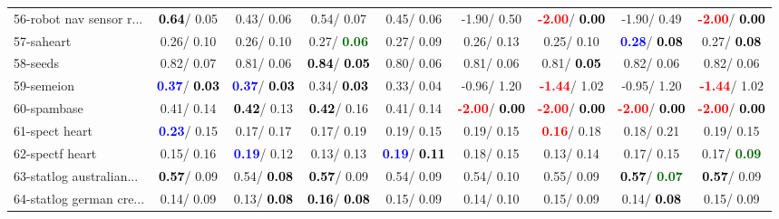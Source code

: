 \begin{table}[h]
\begin{center}
\begin{tabular}{lc|c|c|c|c|c|c|c}
56-robot nav sensor r... & \textcolor{black}{\textbf{  0.64}}/  0.05 &   0.43/  0.06 &   0.54/  0.07 &   0.45/  0.06 &  -1.90/  0.50 & \textcolor{red}{\textbf{ -2.00}}/\textcolor{black}{\textbf{  0.00}} &  -1.90/  0.49 & \textcolor{red}{\textbf{ -2.00}}/\textcolor{black}{\textbf{  0.00}} \\
57-saheart &   0.26/  0.10 &   0.26/  0.10 &   0.27/\textcolor{darkgreen}{\textbf{  0.06}} &   0.27/  0.09 &   0.26/  0.13 &   0.25/  0.10 & \textcolor{blue}{\textbf{  0.28}}/\textcolor{black}{\textbf{  0.08}} &   0.27/\textcolor{black}{\textbf{  0.08}} \\
58-seeds &   0.82/  0.07 &   0.81/  0.06 & \textcolor{black}{\textbf{  0.84}}/\textcolor{black}{\textbf{  0.05}} &   0.80/  0.06 &   0.81/  0.06 &   0.81/\textcolor{black}{\textbf{  0.05}} &   0.82/  0.06 &   0.82/  0.06 \\
59-semeion & \textcolor{blue}{\textbf{  0.37}}/\textcolor{black}{\textbf{  0.03}} & \textcolor{blue}{\textbf{  0.37}}/\textcolor{black}{\textbf{  0.03}} &   0.34/\textcolor{black}{\textbf{  0.03}} &   0.33/  0.04 &  -0.96/  1.20 & \textcolor{red}{\textbf{ -1.44}}/  1.02 &  -0.95/  1.20 & \textcolor{red}{\textbf{ -1.44}}/  1.02 \\
60-spambase &   0.41/  0.14 & \textcolor{black}{\textbf{  0.42}}/  0.13 & \textcolor{black}{\textbf{  0.42}}/  0.16 &   0.41/  0.14 & \textcolor{red}{\textbf{ -2.00}}/\textcolor{black}{\textbf{  0.00}} & \textcolor{red}{\textbf{ -2.00}}/\textcolor{black}{\textbf{  0.00}} & \textcolor{red}{\textbf{ -2.00}}/\textcolor{black}{\textbf{  0.00}} & \textcolor{red}{\textbf{ -2.00}}/\textcolor{black}{\textbf{  0.00}} \\ \hline
61-spect heart & \textcolor{blue}{\textbf{  0.23}}/  0.15 &   0.17/  0.17 &   0.17/  0.19 &   0.19/  0.15 &   0.19/  0.15 & \textcolor{red}{\textbf{  0.16}}/  0.18 &   0.18/  0.21 &   0.19/  0.15 \\
62-spectf heart &   0.15/  0.16 & \textcolor{blue}{\textbf{  0.19}}/  0.12 &   0.13/  0.13 & \textcolor{blue}{\textbf{  0.19}}/\textcolor{black}{\textbf{  0.11}} &   0.18/  0.15 &   0.13/  0.14 &   0.17/  0.15 &   0.17/\textcolor{darkgreen}{\textbf{  0.09}} \\
63-statlog australian... & \textcolor{black}{\textbf{  0.57}}/  0.09 &   0.54/\textcolor{black}{\textbf{  0.08}} & \textcolor{black}{\textbf{  0.57}}/  0.09 &   0.54/  0.09 &   0.54/  0.10 &   0.55/  0.09 & \textcolor{black}{\textbf{  0.57}}/\textcolor{darkgreen}{\textbf{  0.07}} & \textcolor{black}{\textbf{  0.57}}/  0.09 \\
64-statlog german cre... &   0.14/  0.09 &   0.13/\textcolor{black}{\textbf{  0.08}} & \textcolor{black}{\textbf{  0.16}}/\textcolor{black}{\textbf{  0.08}} &   0.15/  0.09 &   0.14/  0.10 &   0.15/  0.09 &   0.14/\textcolor{black}{\textbf{  0.08}} &   0.15/  0.09 \\\end{tabular}\label{stratsALCKappa1bCIELM}
\end{center}
\end{table}
